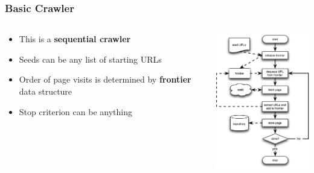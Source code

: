 \documentclass{beamer}
\begin{document}
\begin{frame} \frametitle{Basic Crawler}

  \begin{columns}[T]
    \begin{column}{0.5\textwidth}

    \begin{itemize} 
    \item  This is a \textbf{sequential crawler}
    \item  Seeds can be any list of starting URLs
    \item  Order of page visits is determined by \textbf{frontier} data structure
    \item  Stop criterion can be anything

    \end{itemize}

    \end{column}
    \begin{column}{0.5\textwidth}
      \hfill \includegraphics[width=5cm]{crawler-flow-chart}
    \end{column}


\end{columns}

\end{frame}
\end{document}
